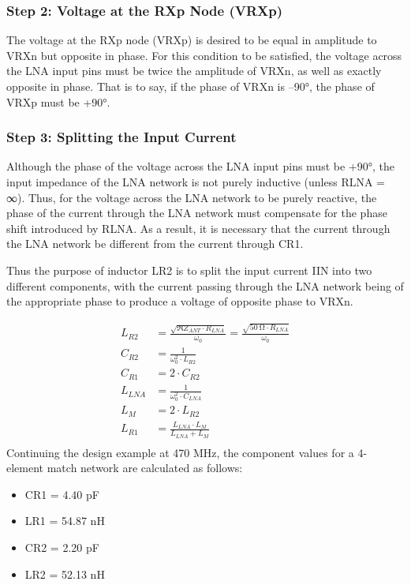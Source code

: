       \subsubsection{Step 2: Voltage at the RXp Node (VRXp)}
        The voltage at the RXp node (VRXp) is desired to be equal in amplitude to VRXn but opposite 
        in phase. For this condition to be satisfied, the voltage across the LNA input pins must be 
        twice the amplitude of VRXn, as well as exactly opposite in phase. That is to say, if the 
        phase of VRXn is –90°, the phase of VRXp must be +90°.
        
      \subsubsection{Step 3: Splitting the Input Current}
        Although the phase of the voltage across the LNA input pins must be +90°, the input 
        impedance of the LNA network is not purely inductive (unless RLNA = ∞). Thus, for the 
        voltage across the LNA network to be purely reactive, the phase of the current through the 
        LNA network must compensate for the phase shift introduced by RLNA. As a result, it is 
        necessary that the current through the LNA network be different from the current through 
        CR1.
        
        Thus the purpose of inductor LR2 is to split the input current IIN into two different 
        components, with the current passing through the LNA network being of the appropriate phase 
        to produce a voltage of opposite phase to VRXn.
        
        \begin{align}
          L_{R2}  &= \frac{\sqrt{\Re{Z_{ANT}}\cdot R_{LNA}}}{\omega_0} 
                   = \frac{\sqrt{\SI{50}{\ohm}\cdot R_{LNA}}}{\omega_0} 
                   \label{EXP001:eq_spirit20}   \\ 
          C_{R2}  &= \frac{1}{\omega_0^2\cdot L_{R2}}          \label{EXP001:eq_spirit21}   \\ 
          C_{R1}  &= 2\cdot C_{R2}                             \label{EXP001:eq_spirit22}   \\ 
          L_{LNA} &= \frac{1}{\omega_0^2\cdot C_{LNA}}         \label{EXP001:eq_spirit23}   \\ 
          L_{M}   &= 2\cdot L_{R2}                             \label{EXP001:eq_spirit24}   \\ 
          L_{R1}  &= \frac{L_{LNA}\cdot L_M}{L_{LNA} + L_M}    \label{EXP001:eq_spirit25}   \\ 
        \end{align}
        Continuing the design example at 470 MHz, the component values for a 4-element match 
        network are calculated as follows:
        \begin{itemize}\addtolength{\itemsep}{-0.5\baselineskip}
          \item CR1 = 4.40 pF
          \item LR1 = 54.87 nH
          \item CR2 = 2.20 pF
          \item LR2 = 52.13 nH          
        \end{itemize}
        
